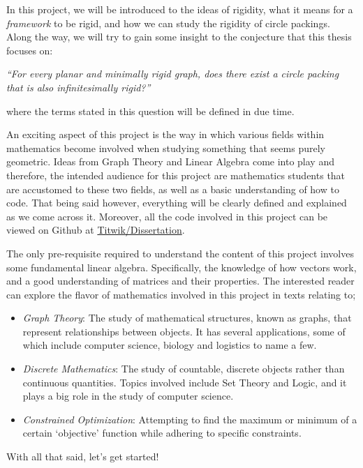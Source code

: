 \begin{flushleft}
In this project, we will be introduced to the ideas of rigidity, what it means for a \textit{framework} to be rigid, and how we can study the rigidity of circle packings. Along the way, we will try to gain some insight to the conjecture that this thesis focuses on:

\begin{center}
    \textit{``For every planar and minimally rigid graph, does there exist a circle packing that is also infinitesimally rigid?''}
\end{center}
\end{flushleft}

\noindent
where the terms stated in this question will be defined in due time.

\begin{flushleft}
An exciting aspect of this project is the way in which various fields within mathematics become involved when studying something that seems purely geometric. Ideas from Graph Theory and Linear Algebra come into play and therefore, the intended audience for this project are mathematics students that are accustomed to these two fields, as well as a basic understanding of how to code. That being said however, everything will be clearly defined and explained as we come across it. Moreover, all the code involved in this project can be viewed on Github at \href{https://github.com/Titwik/Dissertation}{Titwik/Dissertation}.    
\end{flushleft}

\begin{flushleft}
The only pre-requisite required to understand the content of this project involves some fundamental linear algebra. Specifically, the knowledge of how vectors work, and a good understanding of matrices and their properties. The interested reader can explore the flavor of mathematics involved in this project in texts relating to;
\begin{itemize}
    \item \textit{Graph Theory}: The study of mathematical structures, known as graphs, that represent relationships between objects. It has several applications, some of which include computer science, biology and logistics to name a few.
    \item \textit{Discrete Mathematics}: The study of countable, discrete objects rather than continuous quantities. Topics involved include Set Theory and Logic, and it plays a big role in the study of computer science.
    \item \textit{Constrained Optimization}: Attempting to find the maximum or minimum of a certain `objective' function while adhering to specific constraints. 
\end{itemize}
\end{flushleft}

\begin{flushleft}
With all that said, let's get started!
\end{flushleft}

